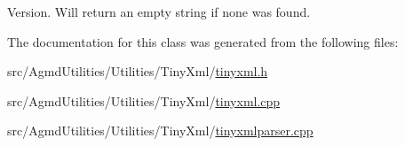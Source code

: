 Version. Will return an empty string if none was found. 



The documentation for this class was generated from the following files\+:\begin{DoxyCompactItemize}
\item 
src/\+Agmd\+Utilities/\+Utilities/\+Tiny\+Xml/\hyperlink{tinyxml_8h}{tinyxml.\+h}\item 
src/\+Agmd\+Utilities/\+Utilities/\+Tiny\+Xml/\hyperlink{tinyxml_8cpp}{tinyxml.\+cpp}\item 
src/\+Agmd\+Utilities/\+Utilities/\+Tiny\+Xml/\hyperlink{tinyxmlparser_8cpp}{tinyxmlparser.\+cpp}\end{DoxyCompactItemize}

